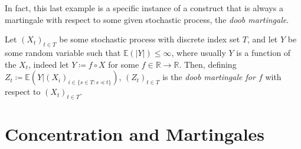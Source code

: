 	In fact, this last example is a specific instance of a construct that is always a 
	martingale with respect to some given stochastic process, the \emph{doob martingale}.
	\begin{definition}
		Let $(X_t)_{t\in T}$ be some stochastic process with discrete index set $T$, and 
		let $Y$ be
		some random variable such that $\mathbb{E}(|Y|) \leq \infty$, where usually $Y$
		is a function of the $X_t$, indeed let $Y \coloneqq f \circ X$ for some 
		$f \in \mathbb{R}\rightarrow\mathbb{R}$. Then, defining $Z_t \coloneqq 
		\mathbb{E}(Y| (X_i)_{i\in
		\{s\in T : s \preceq t \}})$, $(Z_t)_{t\in T}$ is the \emph{doob martingale for $f
		$} with respect to $(X_t)_{t\in T}$.
	\end{definition}

\section{Concentration and Martingales}
